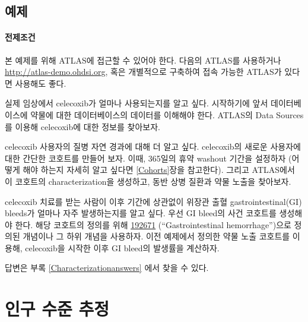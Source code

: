 \documentclass[10.5pt]{book}
\theoremstyle{definition}
\theoremstyle{definition}
\theoremstyle{definition}
\theoremstyle{remark}
\let\BeginKnitrBlock\begin \let\EndKnitrBlock\end
\begin{document}
\section{예제}\label{-6}

\subsubsection*{전제조건}\label{-4}

본 예제를 위해 ATLAS에 접근할 수 있어야 한다. 다음의 ATLAS를 사용하거나
\url{http://atlas-demo.ohdsi.org}, 혹은 개별적으로 구축하여 접속 가능한
ATLAS가 있다면 사용해도 좋다.

\BeginKnitrBlock{exercise}
\protect\hypertarget{exr:exerciseCharacterization1}{}{\label{exr:exerciseCharacterization1}
}실제 임상에서 celecoxib가 얼마나 사용되는지를 알고 싶다. 시작하기에
앞서 데이터베이스에 약물에 대한 데이터베이스의 데이터를 이해해야 한다.
ATLAS의 Data Sources를 이용해 celecoxib에 대한 정보를 찾아보자.
\EndKnitrBlock{exercise}

\BeginKnitrBlock{exercise}
\protect\hypertarget{exr:exerciseCharacterization2}{}{\label{exr:exerciseCharacterization2}
}celecoxib 사용자의 질병 자연 경과에 대해 더 알고 싶다. celecoxib의
새로운 사용자에 대한 간단한 코호트를 만들어 보자. 이때, 365일의 휴약
washout 기간을 설정하자 (어떻게 해야 하는지 자세히 알고 싶다면
\ref{Cohorts}장을 참고한다). 그리고 ATLAS에서 이 코호트의
characterization을 생성하고, 동반 상병 질환과 약물 노출을 찾아보자.
\EndKnitrBlock{exercise}

\BeginKnitrBlock{exercise}
\protect\hypertarget{exr:exerciseCharacterization3}{}{\label{exr:exerciseCharacterization3}
}celecoxib 치료를 받는 사람이 이후 기간에 상관없이 위장관 출혈
gastrointestinal(GI) bleeds가 얼마나 자주 발생하는지를 알고 싶다. 우선
GI bleed의 사건 코호트를 생성해야 한다. 해당 코호트의 정의를 위해
\href{http://athena.ohdsi.org/search-terms/terms/192671}{192671}
(``Gastrointestinal hemorrhage'')으로 정의된 개념이나 그 하위 개념을
사용하자. 이전 예제에서 정의한 약물 노출 코호트를 이용해, celecoxib을
시작한 이후 GI bleed의 발생률을 계산하자.
\EndKnitrBlock{exercise}

답변은 부록 \ref{Characterizationanswers} 에서 찾을 수 있다.

\chapter{인구 수준 추정}\label{PopulationLevelEstimation}
\end{document}
